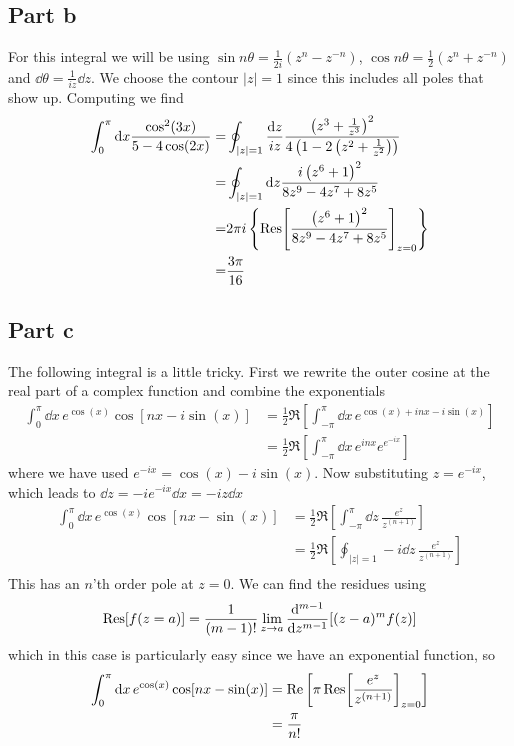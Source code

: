 \documentclass[a4paper,12pt]{article}
\begin{document}
\subsection*{Part b}
For this integral we will be using $\sin n\theta =\frac{1}{2i}\left(z^n-z^{-n}\right)$, $\cos n\theta =\frac{1}{2}\left(z^n+z^{-n}\right)$ and $\dd \theta=\frac{1}{iz}\dd z$. We choose the contour $|z|=1$ since this includes all poles that show up. Computing we find
\begin{equation}
	\begin{aligned}
		\int_{0}^{\pi}\dd x\frac{\cos^2(3x)}{5-4\cos(2x)}
		=&\oint_{|z|=1}\frac{\dd z}{iz}\frac{\left(z^3+\frac{1}{z^3}\right)^2}{4 \left(1-2 \left(z^2+\frac{1}{z^2}\right)\right)}\\
		=&\oint_{|z|=1}\dd z \frac{i \left(z^6+1\right)^2}{8 z^9-4 z^7+8 z^5}\\
			=&2\pi i \left\{
			\Res[\frac{\left(z^6+1\right)^2}{8 z^9-4 z^7+8 z^5}]_{z=0}
			\right\}\\
			=&\frac{3\pi}{16}
	\end{aligned}
\end{equation}
\subsection*{Part c}
The following integral is a little tricky. First we rewrite the outer cosine at the real part of a complex function and combine the exponentials
\begin{equation}
\begin{aligned}
\int_{0}^{\pi}\dd x\, e^{\cos(x)}\cos[nx-i\sin(x)]&=\frac{1}{2}\Re\left[\int_{-\pi}^{\pi}\dd x\, e^{\cos(x)+inx-i\sin(x)}\right]\\
&=\frac{1}{2}\Re\left[\int_{-\pi}^{\pi}\dd x\, e^{inx}e^{e^{-ix}}\right]
\end{aligned}
\end{equation}
where we have used $e^{-ix}=\cos(x)-i\sin(x)$. Now
substituting $z=e^{-ix}$, which leads to $\dd z=-i e^{-ix} \dd x=-iz \dd x$
\begin{equation}
	\begin{aligned}
\int_{0}^{\pi}\dd x\, e^{\cos(x)}\cos[nx-\sin(x)]&=\frac{1}{2}\Re\left[\int_{-\pi}^{\pi}\dd z\, \frac{e^{z}}{z^{(n+1)}}\right]\\
&=\frac{1}{2}\Re\left[\oint_{|z|=1}-i\dd z\, \frac{e^{z}}{z^{(n+1)}}\right]\\
	\end{aligned}
\end{equation}
This has an $n$'th order pole at $z=0$. We can find the residues using
\begin{equation}
	\Res[f(z=a)]=\frac{1}{(m-1)!}\lim_{z\to a}\dv[m-1]{}{z}[(z-a)^mf(z)]
\end{equation}
which in this case is particularly easy since we have an exponential function, so
\begin{equation}
	\begin{aligned}
		\int_{0}^{\pi}\dd x\, e^{\cos(x)}\cos[nx-\sin(x)]&=
		\Re\left [\pi \Res[\frac{e^{z}}{z^{(n+1)}}]_{z=0}\right]\\
		&=\frac{\pi}{n!}
	\end{aligned}
\end{equation}
\end{document}

